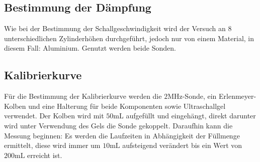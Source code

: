 \subsection{Bestimmung der Dämpfung}
Wie bei der Bestimmung der Schallgeschwindigkeit wird der Versuch an 8
unterschiedlichen Zylinderhöhen durchgeführt, jedoch nur von einem Material, 
in diesem Fall: Aluminium. Genutzt werden beide Sonden.

\subsection{Kalibrierkurve}
Für die Bestimmung der Kalibrierkurve werden die $2 \unit{\mega\hertz}$-Sonde, 
ein Erlenmeyer-Kolben und eine Halterung für beide Komponenten sowie Ultraschallgel 
verwendet. Der Kolben wird mit $50 \unit{\milli\liter}$ aufgefüllt und eingehängt,
direkt darunter wird unter Verwendung des Gels die Sonde gekoppelt. Daraufhin 
kann die Messung beginnen: Es werden die Laufzeiten in Abhängigkeit der Füllmenge 
ermittelt, diese wird immer um $10 \unit{\milli\liter}$ aufsteigend verändert 
bis ein Wert von $200 \unit{\milli\liter}$ erreicht ist.
